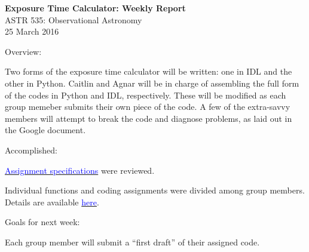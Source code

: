 \documentclass[12pt]{article}
\begin{document}
\begin{centering}
    {\large \textbf{Exposure Time Calculator: Weekly Report}}\\
    ASTR 535: Observational Astronomy\\
    25 March 2016\\
\end{centering}

\vspace{1cm}
Overview:
\vspace{-1.5em}
\begin{itemize*}
    \item Two forms of the exposure time calculator will be written: one in IDL and
        the other in Python.
        Caitlin and Agnar will be in charge of assembling the full form of the codes
        in Python and IDL, respectively.
        These will be modified as each group memeber submits their own piece
        of the code.
        A few of the extra-savvy members will attempt to break the code and diagnose
        problems, as laid out in the Google document.
\end{itemize*}

Accomplished:
\vspace{-1.5em}
\begin{itemize*}
    \item \href{http://astronomy.nmsu.edu/holtz/a535/project/}
        {\textcolor{blue}{Assignment specifications}} were reviewed.
    \item Individual
        functions and coding assignments were divided among group members.\\
        Details are available
        \href{https://docs.google.com/document/d/1BaF0ILo2b9gBW5ujPOmUyfkDtF6tfMoEgPA7_B5HZS8/edit}
        {\textcolor{blue}{here}}.
\end{itemize*}

Goals for next week:
\vspace{-1.5em}
\begin{itemize*}
    \item Each group member will submit a ``first draft'' of their assigned code.
\end{itemize*}
\end{document}

